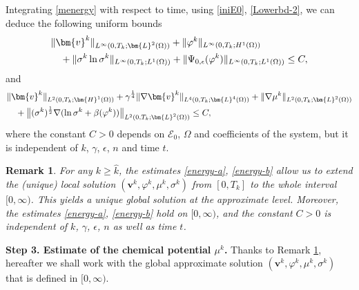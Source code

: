 \documentclass[11pt,reqno]{amsart}
\newtheorem{remark}{\textbf{Remark}}[section]
\begin{document}
Integrating \eqref{menergy} with respect to time, using \eqref{iniE0}, \eqref{Lowerbd-2}, we can deduce the following uniform bounds
%
\begin{align}
&\|\bm{v}^k\|_{L^{\infty}(0, T_k ; \bm{L}^2(\Omega))}
+\|\varphi^k\|_{L^{\infty}(0, T_k ; H^1(\Omega))}
\notag \\
&\quad +\|\sigma^k \ln \sigma^k\|_{L^{\infty}(0, T_k ; L^{1}(\Omega))} +\|\Psi_{0,\epsilon}(\varphi^k)\|_{L^{\infty}(0, T_k; L^{1}(\Omega))}
\leq C,
\label{energy-a}
\end{align}
and
%
\begin{align}
&\|\bm{v}^k\|_{L^{2}(0, T_k ; \bm{H}^1(\Omega))}
+ \gamma^\frac14\|\nabla \bm{v}^k\|_{L^{4}(0, T_k ; \bm{L}^4(\Omega))}
+\|\nabla \mu^k\|_{L^{2}(0, T_k ; \bm{L}^{2}(\Omega))}
\notag\\
&\quad + \big\| (\sigma^k)^\frac{1}{2}\nabla(\ln \sigma^k +\beta(\varphi^k))\big\|_{L^{2}(0, T_k; \bm{L}^{2}(\Omega))}
\leq C,
\label{energy-b}
\end{align}
where the constant $C>0$ depends on $\mathcal{E}_0$, $\Omega$ and coefficients of the system, but it is independent of $k$, $\gamma$, $\epsilon$, $n$ and time $t$.

\begin{remark}\rm
\label{app-glosol}
For any $k\geq \widehat{k}$, the estimates \eqref{energy-a}, \eqref{energy-b} allow us to extend the (unique) local solution
$(\bm{v}^k,\varphi^k,\mu^k,\sigma^k)$
from $[0,T_k]$ to the whole interval $[0,\infty)$. This yields a unique global solution at the approximate level. Moreover, the estimates \eqref{energy-a}, \eqref{energy-b} hold on $[0,\infty)$, and the constant $C>0$ is independent of $k$, $\gamma$, $\epsilon$, $n$ as well as time $t$.
\end{remark}

\textbf{Step 3. Estimate of the chemical potential $\mu^k$.}
Thanks to Remark \ref{app-glosol}, hereafter we shall work with the global approximate solution $(\bm{v}^k,\varphi^k,\mu^k,\sigma^k)$ that is defined in $[0,\infty)$.
\end{document}
